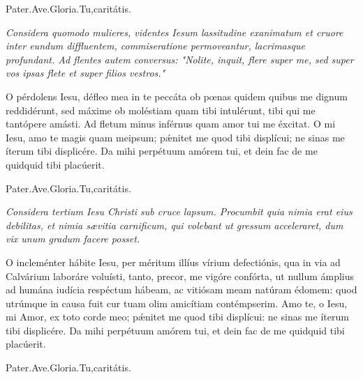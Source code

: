 \documentclass[12pt,a6paper]{book}
\newcommand{\V}{\textbf{V.} }
\newcommand{\R}{\textbf{R.} }
\newcommand{\officiumtitle}[1]{\subsection*{\parbox{\linewidth}{\centering\textbf{\textit{#1}}}}}
\newcommand{\centeredtext}[1]{\parbox{\linewidth}{\centering\textit{#1}}}
\begin{document}
\begin{sloppy}
Pater.Ave.Gloria.Tu,caritátis.


\textit{Considera quomodo mulieres, videntes Iesum lassitudine exanimatum et cruore inter eundum diffluentem, commiseratione permoveantur, lacrimasque profundant. Ad flentes autem conversus: "Nolite, inquit, flere super me, sed super vos ipsas flete et super filios vestros."}

O pérdolens Iesu, défleo mea in te peccáta ob pœnas quidem quibus me dignum reddidérunt, sed máxime ob moléstiam quam tibi intulérunt, tibi qui me tantópere amásti. Ad fletum minus inférnus quam amor tui me éxcitat. O mi Iesu, amo te magis quam meipsum; pǽnitet me quod tibi displícui; ne sinas me íterum tibi displicére. Da mihi perpétuum amórem tui, et dein fac de me quidquid tibi placúerit.

Pater.Ave.Gloria.Tu,caritátis.


\textit{Considera tertium Iesu Christi sub cruce lapsum. Procumbit quia nimia erat eius debilitas, et nimia sævitia carnificum, qui volebant ut gressum acceleraret, dum vix unum gradum facere posset.}

O incleménter hábite Iesu, per méritum illíus vírium defectiónis, qua in via ad Calvárium laboráre voluísti, tanto, precor, me vigóre confórta, ut nullum ámplius ad humána iudícia respéctum hábeam, ac vitiósam meam natúram édomem: quod utrúmque in causa fuit cur tuam olim amicítiam contémpserim. Amo te, o Iesu, mi Amor, ex toto corde meo; pǽnitet me quod tibi displícui: ne sinas me íterum tibi displicére. Da mihi perpétuum amórem tui, et dein fac de me quidquid tibi placúerit.

Pater.Ave.Gloria.Tu,caritátis.



\end{sloppy}
\end{document}

